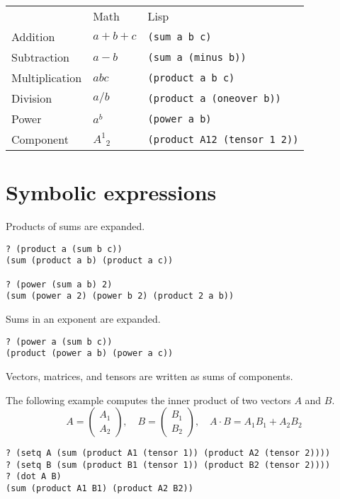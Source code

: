 \documentclass[12pt]{article}
\begin{document}
\begin{center}
\begin{tabular}{lll}
& Math & Lisp
\\[1ex]
Addition & $a+b+c$ & \verb$(sum a b c)$
\\[1ex]
Subtraction & $a-b$ & \verb$(sum a (minus b))$
\\[1ex]
Multiplication & $abc$ & \verb$(product a b c)$
\\[1ex]
Division & $a/b$ & \verb$(product a (oneover b))$
\\[1ex]
Power & $a^b$ & \verb$(power a b)$
\\[1ex]
Component & $A^1{}_2$ & \verb$(product A12 (tensor 1 2))$
\end{tabular}
\end{center}

\section*{Symbolic expressions}

Products of sums are expanded.
\begin{verbatim}
? (product a (sum b c))
(sum (product a b) (product a c))

? (power (sum a b) 2)
(sum (power a 2) (power b 2) (product 2 a b))
\end{verbatim}

Sums in an exponent are expanded.
\begin{verbatim}
? (power a (sum b c))
(product (power a b) (power a c))
\end{verbatim}

Vectors, matrices, and tensors are written as sums of components.

\bigskip
The following example computes the inner product of two vectors $A$ and $B$.
\begin{equation*}
A=\begin{pmatrix}A_1\\A_2\end{pmatrix},
\quad
B=\begin{pmatrix}B_1\\B_2\end{pmatrix},
\quad
A\cdot B=A_1B_1+A_2B_2
\end{equation*}
\begin{verbatim}
? (setq A (sum (product A1 (tensor 1)) (product A2 (tensor 2))))
? (setq B (sum (product B1 (tensor 1)) (product B2 (tensor 2))))
? (dot A B)
(sum (product A1 B1) (product A2 B2))
\end{verbatim}
\end{document}
